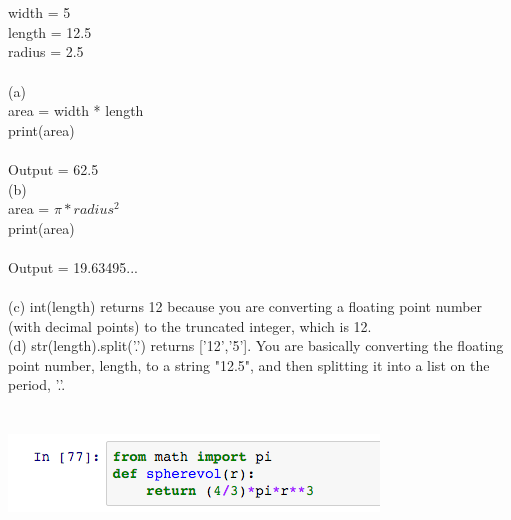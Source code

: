 \documentclass[12pt]{article}
\begin{document}
\section{}
width = 5\\
length = 12.5\\
radius = 2.5\\~\\
(a) \\
area = width * length \\
print(area)\\~\\
Output = 62.5\\
(b) \\
area = $\pi * radius^2$\\
print(area)\\~\\
Output = 19.63495...\\~\\
(c) int(length) returns 12 because you are converting a floating point number (with decimal points) to the truncated integer, which is 12.\\
(d) str(length).split('.') returns ['12','5']. You are basically converting the floating point number, length, to a string "12.5", and then splitting it into a list on the period, '.'. \\

\section{}
\includegraphics[width=.55\textwidth]{spherevol.png}
\end{document}

